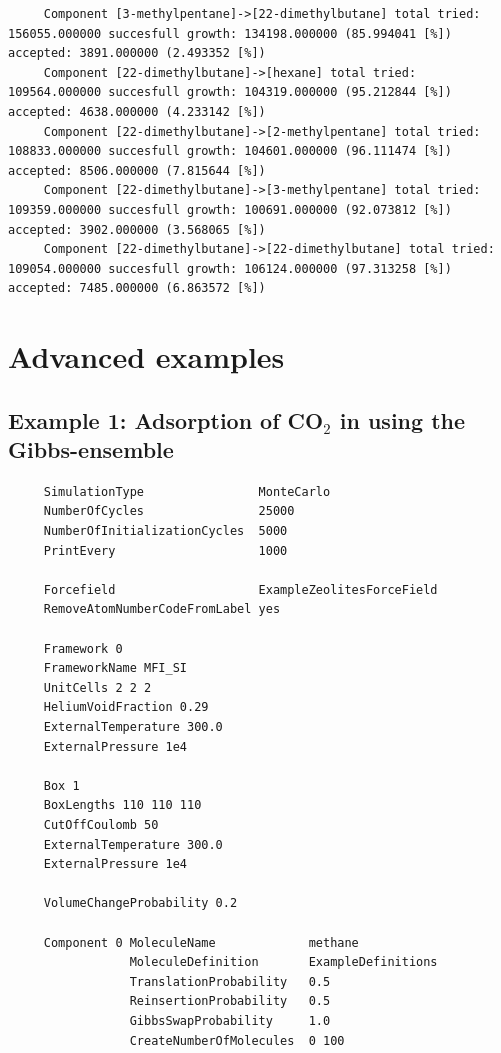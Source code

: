 \begin{tiny}
\begin{verbatim}
     Component [3-methylpentane]->[22-dimethylbutane] total tried: 156055.000000 succesfull growth: 134198.000000 (85.994041 [%]) accepted: 3891.000000 (2.493352 [%])
     Component [22-dimethylbutane]->[hexane] total tried: 109564.000000 succesfull growth: 104319.000000 (95.212844 [%]) accepted: 4638.000000 (4.233142 [%])
     Component [22-dimethylbutane]->[2-methylpentane] total tried: 108833.000000 succesfull growth: 104601.000000 (96.111474 [%]) accepted: 8506.000000 (7.815644 [%])
     Component [22-dimethylbutane]->[3-methylpentane] total tried: 109359.000000 succesfull growth: 100691.000000 (92.073812 [%]) accepted: 3902.000000 (3.568065 [%])
     Component [22-dimethylbutane]->[22-dimethylbutane] total tried: 109054.000000 succesfull growth: 106124.000000 (97.313258 [%]) accepted: 7485.000000 (6.863572 [%])
\end{verbatim}
\end{tiny}

\section{Advanced examples}

\subsection*{Example 1: Adsorption of CO$_2$ in using the Gibbs-ensemble}

\begin{tiny}
\begin{verbatim}
     SimulationType                MonteCarlo
     NumberOfCycles                25000
     NumberOfInitializationCycles  5000
     PrintEvery                    1000
     
     Forcefield                    ExampleZeolitesForceField
     RemoveAtomNumberCodeFromLabel yes
     
     Framework 0
     FrameworkName MFI_SI
     UnitCells 2 2 2
     HeliumVoidFraction 0.29
     ExternalTemperature 300.0
     ExternalPressure 1e4
     
     Box 1
     BoxLengths 110 110 110
     CutOffCoulomb 50
     ExternalTemperature 300.0
     ExternalPressure 1e4
     
     VolumeChangeProbability 0.2
     
     Component 0 MoleculeName             methane
                 MoleculeDefinition       ExampleDefinitions
                 TranslationProbability   0.5
                 ReinsertionProbability   0.5
                 GibbsSwapProbability     1.0
                 CreateNumberOfMolecules  0 100
\end{verbatim}
\end{tiny}

